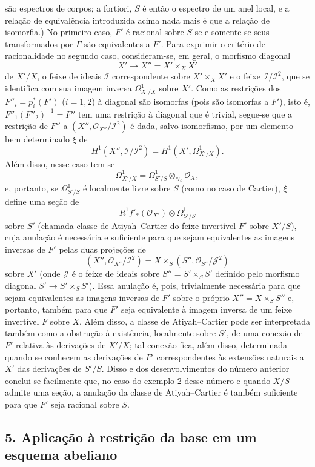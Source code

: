 são espectros de corpos; a fortiori, $S$ é então o espectro de um anel
local, e a relação de equivalência introduzida acima nada mais é que a relação
de isomorfia.) No primeiro caso, $F'$ é racional sobre $S$ se e somente se seus
transformados por $\Gamma$ são equivalentes a $F'$. Para exprimir o critério
de racionalidade no segundo caso, consideram-se, em geral, o morfismo
diagonal
\[
  X'\longrightarrow X''=X'\times_XX'
\]
de $X'/X$, o feixe de ideais $\mathcal I$ correspondente sobre
$X'\times_XX'$ e o feixe $\mathcal I/\mathcal I^2$, que se identifica com sua
imagem inversa $\Omega^1_{X'/X}$ sobre $X'$. Como as restrições dos
$F''_i=p_i^*(F')$ ($i=1,2$) à diagonal são isomorfas (pois são isomorfas a
$F'$), isto é, $F''_1(F''_2)^{-1}=F''$ tem uma restrição à diagonal
que é trivial, segue-se que a restrição de $F''$ a
$(X'',\mathcal O_{X''}/\mathcal I^2)$ é dada, salvo isomorfismo, por um
elemento bem determinado $\xi$ de
\[
  H^1(X'',\mathcal I/\mathcal I^2)
  =H^1(X',\Omega^1_{X'/X}).
\]
Além disso, nesse caso tem-se
\[
  \Omega^1_{X'/X}
  =\Omega^1_{S'/S}\otimes_{\mathcal O_S}\mathcal O_X,
\]
e, portanto, se $\Omega^1_{S'/S}$ é localmente livre sobre $S$ (como no
caso de Cartier), $\xi$ define uma seção de
\[
  R^1f'_*(\mathcal O_{X'})\otimes\Omega^1_{S'/S}
\]
sobre $S'$ (chamada classe de Atiyah--Cartier do feixe invertível $F'$ sobre
$X'/S$), cuja anulação é necessária e suficiente para que sejam equivalentes
as imagens inversas de $F'$ pelas duas projeções de
\[
  (X'',\mathcal O_{X''}/\mathcal I^2)
  =X\times_S(S'',\mathcal O_{S''}/\mathcal J^2)
\]
sobre $X'$ (onde $\mathcal J$ é o feixe de ideais sobre
$S''=S'\times_SS'$ definido pelo morfismo diagonal
$S'\longrightarrow S'\times_SS'$). Essa anulação é, pois, trivialmente
necessária para que sejam equivalentes as imagens inversas de $F'$ sobre o
próprio $X''=X\times_SS''$ e, portanto, também para que $F'$ seja equivalente
à imagem inversa de um feixe invertível $F$ sobre $X$. Além disso, a classe de
Atiyah--Cartier pode ser interpretada também como a obstrução à existência,
localmente sobre $S'$, de uma conexão de $F'$ relativa às derivações de
$X'/X$; tal conexão fica, além disso, determinada quando se conhecem as
derivações de $F'$ correspondentes às extensões naturais a $X'$ das
derivações de $S'/S$. Disso e dos desenvolvimentos do número anterior
conclui-se facilmente que, no caso do exemplo 2 desse número e quando $X/S$
admite uma seção, a anulação da classe de Atiyah--Cartier é também
suficiente para que $F'$ seja racional sobre $S$.

\subsection*{5. Aplicação à restrição da base em um esquema abeliano}


